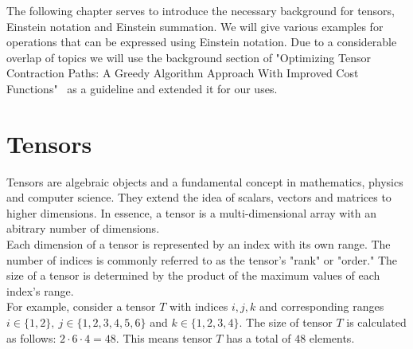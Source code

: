 The following chapter serves to introduce the necessary background for tensors,
Einstein notation and Einstein summation. We will give various examples for
operations that can be expressed using Einstein notation. Due to
a considerable overlap of topics we will use the background section of
"Optimizing Tensor Contraction Paths: A Greedy Algorithm Approach With Improved Cost
Functions"~\cite{cgreedy} as a guideline and extended it for our uses.

\section{Tensors}
Tensors are algebraic objects and a fundamental concept in mathematics, physics
and computer science. They extend the idea of scalars, vectors and matrices to
higher dimensions. In essence, a tensor is a multi-dimensional array with an abitrary
number of dimensions.\\
Each dimension of a tensor is represented by an index with its own range.
The number of indices is commonly referred to as the tensor's "rank" or "order."
The size of a tensor is determined by the product of the maximum values of each
index's range.\\
For example, consider a tensor $T$ with indices $i,j,k$ and corresponding ranges\\
$i \in \{1,2\},\ j \in \{1,2,3,4,5,6\}$ and $k \in \{1,2,3,4\}$. The size of
tensor $T$ is calculated as follows: $2 \cdot 6 \cdot 4 = 48$. This means tensor
$T$ has a total of $48$ elements.

